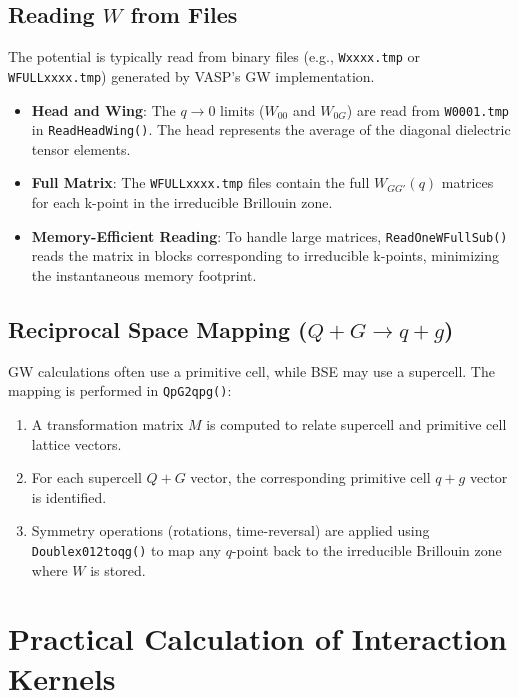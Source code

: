 \documentclass{article}
\begin{document}
\subsection{Reading $W$ from Files}
The potential is typically read from binary files (e.g., \texttt{Wxxxx.tmp} or \texttt{WFULLxxxx.tmp}) generated by VASP's GW implementation.
\begin{itemize}
    \item \textbf{Head and Wing}: The $q \to 0$ limits ($W_{00}$ and $W_{0G}$) are read from \texttt{W0001.tmp} in \texttt{ReadHeadWing()}. The head represents the average of the diagonal dielectric tensor elements.
    \item \textbf{Full Matrix}: The \texttt{WFULLxxxx.tmp} files contain the full $W_{GG'}(q)$ matrices for each k-point in the irreducible Brillouin zone.
    \item \textbf{Memory-Efficient Reading}: To handle large matrices, \texttt{ReadOneWFullSub()} reads the matrix in blocks corresponding to irreducible k-points, minimizing the instantaneous memory footprint.
\end{itemize}

\subsection{Reciprocal Space Mapping ($Q+G \to q+g$)}
GW calculations often use a primitive cell, while BSE may use a supercell. The mapping is performed in \texttt{QpG2qpg()}:
\begin{enumerate}
    \item A transformation matrix $M$ is computed to relate supercell and primitive cell lattice vectors.
    \item For each supercell $Q+G$ vector, the corresponding primitive cell $q+g$ vector is identified.
    \item Symmetry operations (rotations, time-reversal) are applied using \texttt{Doublex012toqg()} to map any $q$-point back to the irreducible Brillouin zone where $W$ is stored.
\end{enumerate}

\section{Practical Calculation of Interaction Kernels}
\end{document}
